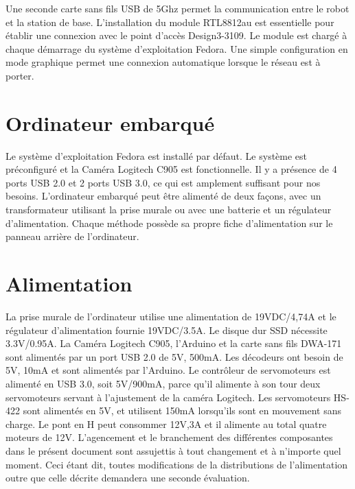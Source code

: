  Une seconde carte sans fils USB de 5Ghz permet la communication entre le robot et la station de base. L’installation du module RTL8812au est essentielle pour établir une connexion avec le point d’accès Design3-3109. Le module est chargé à chaque démarrage du système d’exploitation Fedora. Une simple configuration en mode graphique permet une connexion automatique lorsque le réseau est à porter. 

\section{Ordinateur embarqué}
Le système d’exploitation Fedora est installé par défaut. Le système est préconfiguré et la Caméra Logitech C905 est fonctionnelle.  Il y a présence de 4 ports USB 2.0 et 2 ports USB 3.0, ce qui est amplement suffisant pour nos besoins. L’ordinateur embarqué peut être alimenté de deux façons, avec un transformateur utilisant la prise murale ou avec une batterie et un régulateur d’alimentation. Chaque méthode possède sa propre fiche d’alimentation sur le panneau arrière de l’ordinateur. 


\section{Alimentation}
   La prise murale de l'ordinateur utilise une alimentation de 19VDC/4,74A et le régulateur d’alimentation fournie 19VDC/3.5A. Le disque dur SSD nécessite 3.3V/0.95A. La Caméra Logitech C905, l’Arduino et la carte sans fils DWA-171 sont alimentés par un port USB 2.0 de 5V, 500mA. Les décodeurs ont besoin de 5V, 10mA et sont alimentés par l’Arduino. Le contrôleur de servomoteurs est alimenté en USB 3.0, soit 5V/900mA, parce qu'il alimente à son tour deux servomoteurs servant à l'ajustement de la caméra Logitech. Les servomoteurs HS-422 sont alimentés en 5V, et utilisent 150mA lorsqu’ils sont en mouvement sans charge. Le pont en H peut consommer 12V,3A et il alimente au total quatre moteurs de 12V. L'agencement et le branchement des différentes composantes dans le présent document sont assujettis à tout changement et à n'importe quel moment. Ceci étant dit, toutes modifications de la distributions de l'alimentation outre que celle décrite demandera une seconde évaluation.  

